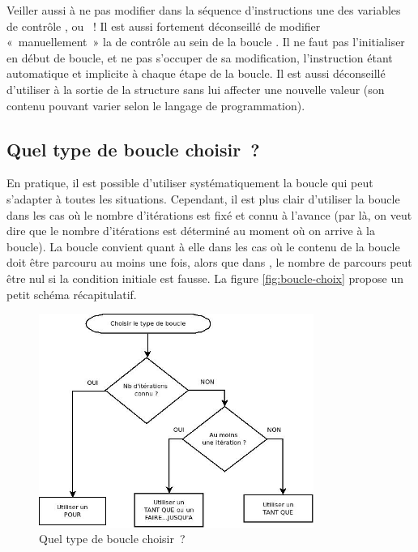 		Veiller aussi à ne pas modifier dans la séquence d’instructions une des
		variables de contrôle ,  ou ~! Il
		est aussi fortement déconseillé de modifier «~manuellement~» la
		 de contrôle au sein de la boucle
		. Il ne faut pas l’initialiser en début de boucle,
		et ne pas s’occuper de sa modification, l’instruction 
		étant automatique et implicite à chaque étape de la
		boucle. Il est aussi déconseillé d’utiliser  à la
		sortie de la structure  sans lui affecter une
		nouvelle valeur (son contenu pouvant varier selon le langage de
		programmation).

	\subsection{Quel type de boucle choisir~?}

		En pratique, il est possible d’utiliser systématiquement la boucle 
		 qui peut s’adapter à toutes les situations. 
		Cependant, il est plus clair d’utiliser la boucle  
		dans les cas où le nombre d’itérations est fixé et connu à l’avance 
		(par là, on veut dire que le nombre d’itérations est déterminé au moment 
		où on arrive à la boucle). 
		La boucle  convient quant à elle
		dans les cas où le contenu de la boucle doit être parcouru au moins une
		fois, alors que dans , 
		le nombre de parcours peut être nul si la condition initiale est fausse. 
		La figure \vref{fig:boucle-choix} propose un petit schéma récapitulatif.

		\begin{figure}[h]
		\centering
		\includegraphics[width=0.8\textwidth]{image/boucle-choixtype}
		\caption{Quel type de boucle choisir~?}
		\label{fig:boucle-choix}
		\end{figure}

